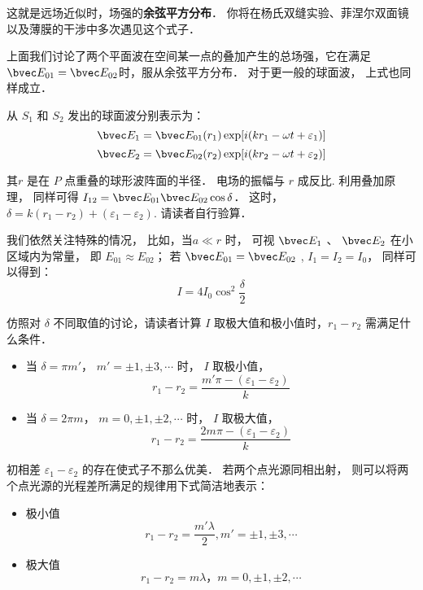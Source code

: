 这就是远场近似时，场强的\textbf{余弦平方分布}． 你将在杨氏双缝实验、菲涅尔双面镜以及薄膜的干涉中多次遇见这个式子．

上面我们讨论了两个平面波在空间某一点的叠加产生的总场强，它在满足 $ \bvec E_{01} = \bvec E_{02}$时，服从余弦平方分布． 对于更一般的球面波， 上式也同样成立． 

从 $ S_1 $ 和 $ S_2 $ 发出的球面波分别表示为：
$$ \bvec E_1 = \bvec E_{ 01 } ( r_1 ) \exp[ i( k r_1 - \omega t+ \varepsilon_1 )]$$
$$ \bvec E_2 = \bvec E_{ 02 } ( r_2 ) \exp[ i( k r_2 - \omega t+ \varepsilon_2 )]$$

其$ r $ 是在 $ P $ 点重叠的球形波阵面的半径． 电场的振幅与 $ r $ 成反比. 利用叠加原理， 同样可得 $I_{12} = \bvec E_{01}\bvec E_{02} \cos\delta$． 这时， $ \delta = k ( r_1 - r_2 ) + ( \varepsilon_1 - \varepsilon_2 )$.  请读者自行验算．

我们依然关注特殊的情况， 比如，当$ a \ll r $ 时， 可视 $ \bvec E_1$ 、 $ \bvec E_2$ 在小区域内为常量， 即 $ E_{ 01} \approx E_{02}$； 若 $ \bvec E_{01} = \bvec E_{02} $ , $ I_1 = I_2 = I_0 $， 同样可以得到：
\begin{equation}
 I = 4 I_0 \cos ^2\dfrac { \delta } { 2 }
\end{equation}

\begin{exercise}{}
仿照对 $ \delta$ 不同取值的讨论，请读者计算 $ I $ 取极大值和极小值时，$ r_1 - r_2 $ 需满足什么条件．
\end{exercise}

\begin{itemize}
\item 当 $ \delta = \pi m'$， $ m' = \pm 1, \pm 3, \cdots $ 时， $ I $ 取极小值， 
\begin{equation}
r_1 - r_2 = \dfrac{ m' \pi - ( \varepsilon _1 - \varepsilon _2)} { k }
\end{equation}
\item 当 $ \delta = 2 \pi m$， $ m = 0, \pm 1, \pm 2, \cdots $ 时， $ I $ 取极大值， 
\begin{equation}
 r_1 - r_2 = \dfrac{ 2m \pi - ( \varepsilon _1 - \varepsilon _2)} { k }
\end{equation}
\end{itemize}

初相差 $ \varepsilon_1 - \varepsilon_2 $ 的存在使式子不那么优美． 若两个点光源同相出射， 则可以将两个点光源的光程差所满足的规律用下式简洁地表示：

\begin{corollary}{}

\begin{itemize}
\item 极小值 
\begin{equation}
r_1 - r_2 = \dfrac{ m' \lambda} { 2 } , m' = \pm 1, \pm 3, \cdots
\end{equation}

\item 极大值 
\begin{equation}
 r_1 - r_2 = m \lambda ， m = 0 ,\pm 1, \pm 2,\cdots 
\end{equation}

\end{itemize}

\end{corollary}


